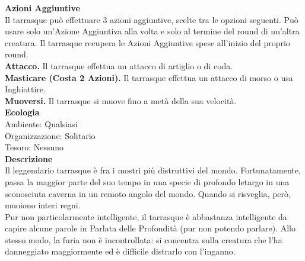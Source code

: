 \begin{multicols}{2}
\textbf{Azioni Aggiuntive}\\
Il tarrasque può effettuare 3 azioni aggiuntive, scelte tra le opzioni seguenti. Può usare solo un'Azione Aggiuntiva alla volta e solo al termine del round di un'altra creatura. Il tarrasque recupera le Azioni Aggiuntive spese all'inizio del proprio round.\\
\textbf{Attacco.} Il tarrasque effettua un attacco di artiglio o di coda. \\
\textbf{Masticare (Costa 2 Azioni).} Il tarrasque effettua un attacco di morso o usa Inghiottire.\\
\textbf{Muoversi.} Il tarrasque si muove fino a metà della sua velocità.\\
\textbf{Ecologia}\\
Ambiente: Qualsiasi\\
Organizzazione: Solitario\\
Tesoro: Nessuno\\
\textbf{Descrizione}\\
Il leggendario tarrasque è fra i mostri più distruttivi del mondo. Fortunatamente, passa la maggior parte del suo tempo in una specie di profondo letargo in una sconosciuta caverna in un remoto angolo del mondo. Quando si risveglia, però, muoiono interi regni.\\
Pur non particolarmente intelligente, il tarrasque è abbastanza intelligente da capire alcune parole in Parlata delle Profondità (pur non potendo parlare). Allo stesso modo, la furia non è incontrollata: si concentra sulla creatura che l'ha danneggiato maggiormente ed è difficile distrarlo con l'inganno.\\


\end{multicols}
